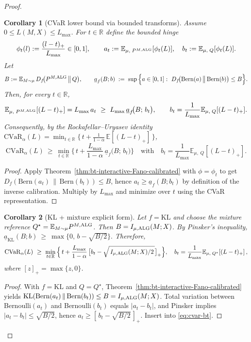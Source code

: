 \documentclass[conference]{IEEEtran}
\newtheorem{corollary}{Corollary}
\begin{document}
\begin{proof}[Proof]
\iffalse
\begin{corollary}[CVaR lower bound via bounded transforms]
\label{cor:cvar-bt}
Assume $0\le L(M,X)\le L_{\max}$. For $t\in\mathbb R$ define the bounded hinge
\[
\phi_t(l):=\frac{(l-t)_+}{L_{\max}}\in[0,1],\qquad
a_t:=\mathbb{E}_{\mu,\;P^{M,\textup{ALG}}}[\phi_t(L)],\quad
b_t:=\mathbb{E}_{\mu,\;Q}[\phi_t(L)].
\]
Let
\[
B:=\mathbb{E}_{M\sim\mu}\, D_f\!\big(P^{M,\textup{ALG}}\,\big\|\,Q\big),
\qquad
\underline a_f(B;b)\;:=\;\sup\Big\{a\in[0,1]:\ D_f\!\big(\mathrm{Bern}(a)\,\big\|\,\mathrm{Bern}(b)\big)\le B\Big\}.
\]
Then, for every $t\in\mathbb R$,
\[
\mathbb{E}_{\mu,\;P^{M,\textup{ALG}}}[(L-t)_+]
= L_{\max}\,a_t
\ \ge\
L_{\max}\,\underline a_f\!\big(B;\,b_t\big),
\qquad
b_t=\frac{1}{L_{\max}}\mathbb{E}_{\mu,\;Q}[(L-t)_+].
\]
Consequently, by the Rockafellar--Uryasev identity
$\mathrm{CVaR}_\alpha(L)=\min_{t\in\mathbb R}\{\,t+\tfrac{1}{1-\alpha}\,\mathbb{E}[(L-t)_+]\,\}$,
\begin{equation}
\label{eq:cvar-bt}
\mathrm{CVaR}_\alpha(L)\ \ge\
\min_{t\in\mathbb R}\Big\{\,t+\frac{L_{\max}}{1-\alpha}\,
\underline a_f\!\big(B;\,b_t\big)\Big\}
\quad\text{with}\quad
b_t=\frac{1}{L_{\max}}\mathbb{E}_{\mu,\;Q}[(L-t)_+].
\end{equation}
\end{corollary}

\begin{proof}
Apply Theorem~\ref{thm:bt-interactive-Fano-calibrated} with $\phi=\phi_t$ to get
$D_f(\mathrm{Bern}(a_t)\,\|\,\mathrm{Bern}(b_t))\le B$, hence $a_t\ge \underline a_f(B;b_t)$ by definition of the inverse calibration. Multiply by $L_{\max}$ and minimize over $t$ using the CVaR representation.
\end{proof}

\begin{corollary}[KL + mixture explicit form]
\label{cor:cvar-kl-mixture}
Let $f=\mathrm{KL}$ and choose the mixture reference $Q^\star=\mathbb{E}_{M\sim\mu}P^{M,\textup{ALG}}$. Then $B=I_{\mu,\textup{ALG}}(M;X)$. By Pinsker’s inequality,
\(
\underline a_{\mathrm{KL}}(B;b)\ \ge\ \max\{0,\,b-\sqrt{B/2}\}.
\)
Therefore,
\begin{equation}
\label{eq:cvar-kl-mixture}
\mathrm{CVaR}_\alpha(L)\ \ge\
\min_{t\in\mathbb R}\Big\{\,t+\frac{L_{\max}}{1-\alpha}\,
\big[b_t-\sqrt{\,I_{\mu,\textup{ALG}}(M;X)/2\,}\big]_+\Big\},
\quad
b_t=\frac{1}{L_{\max}}\mathbb{E}_{\mu,\;Q^\star}[(L-t)_+]\,,
\end{equation}
where $[z]_+=\max\{z,0\}$.
\end{corollary}

\begin{proof}
With $f=\mathrm{KL}$ and $Q=Q^\star$, Theorem~\ref{thm:bt-interactive-Fano-calibrated} yields
$\mathrm{KL}(\mathrm{Bern}(a_t)\,\|\,\mathrm{Bern}(b_t))\le B=I_{\mu,\textup{ALG}}(M;X)$.
Total variation between Bernoulli$(a_t)$ and Bernoulli$(b_t)$ equals $|a_t-b_t|$, and Pinsker implies
$|a_t-b_t|\le \sqrt{B/2}$, hence $a_t\ge [\,b_t-\sqrt{B/2}\,]_+$. Insert into
\eqref{eq:cvar-bt}.
\end{proof}





\end{proof}
\end{document}
